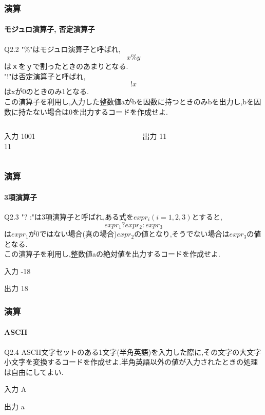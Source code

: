 \documentclass[dvipdfmx]{beamer}
\begin{document}
\begin{frame}
    \frametitle{演算}
    \framesubtitle{モジュロ演算子, 否定演算子}
	\begin{itembox}[l]{Q2.2}
        "\%"はモジュロ演算子と呼ばれ,
        $$x \% y$$
        はｘをｙで割ったときのあまりとなる.\\
        "!"は否定演算子と呼ばれ,
        $$!x$$
        はxが0のときのみ1となる.\\
        この演算子を利用し,入力した整数値aがbを因数に持つときのみbを出力し,bを因数に持たない場合は0を出力するコードを作成せよ.
	\end{itembox}
    \vspace{-30pt}
    \begin{columns}[t, totalwidth=0.98\linewidth]
        \begin{column}{.45\linewidth}
            \begin{block}{入力}
                1001\\
                11
            \end{block}
        \end{column}
        \begin{column}{.45\linewidth}
            \begin{block}{出力}
                11
            \end{block}
        \end{column}
    \end{columns}
\end{frame}

\begin{frame}
    \frametitle{演算}
    \framesubtitle{3項演算子}
	\begin{itembox}[l]{Q2.3}
        "? :"は3項演算子と呼ばれ,ある式を$expr_{i}(i=1,2,3)$とすると,
        $$expr_{1} ? expr_{2}:expr_{3}$$
        は$expr_{1}$が0ではない場合(真の場合)$expr_{2}$の値となり,そうでない場合は$expr_{3}$の値となる.\\
        この演算子を利用し,整数値aの絶対値を出力するコードを作成せよ.
	\end{itembox}
	\begin{block}{入力}
        -18
	\end{block}
	\begin{block}{出力}
        18
	\end{block}
\end{frame}

\begin{frame}
    \frametitle{演算}
    \framesubtitle{ASCII}
	\begin{itembox}[l]{Q2.4}
        ASCII文字セットのある1文字(半角英語)を入力した際に,その文字の大文字小文字を変換するコードを作成せよ.半角英語以外の値が入力されたときの処理は自由にしてよい.
	\end{itembox}
	\begin{block}{入力}
        A
	\end{block}
	\begin{block}{出力}
        a
	\end{block}
\end{frame}
\end{document}
